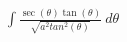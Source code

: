 \documentclass[preview]{standalone}
\begin{document}
\begin{align*}
\int \frac{\sec(\theta)\tan(\theta)}{\sqrt{a^2tan^2(\theta)}} \ d\theta
\end{align*}
\end{document}
